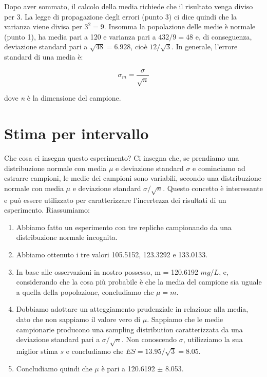 \documentclass[a4paper,12pt,oneside]{book}
\providecommand{\tightlist}{%
  \setlength{\itemsep}{0pt}\setlength{\parskip}{0pt}}
\begin{document}
Dopo aver sommato, il calcolo della media richiede che il risultato venga diviso per 3. La legge di propagazione degli errori (punto 3) ci dice quindi che la varianza viene divisa per \(3^2 = 9\). Insomma la popolazione delle medie è normale (punto 1), ha media pari a 120 e varianza pari a \(432/9 = 48\) e, di conseguenza, deviazione standard pari a \(\sqrt{48} = 6.928\), cioè \(12/\sqrt{3}\). In generale, l'errore standard di una media è:

\[\sigma_m  = \frac{\sigma }{\sqrt n }\]

dove \emph{n} è la dimensione del campione.

\hypertarget{stima-per-intervallo}{%
\section{Stima per intervallo}\label{stima-per-intervallo}}

Che cosa ci insegna questo esperimento? Ci insegna che, se prendiamo una distribuzione normale con media \(\mu\) e deviazione standard \(\sigma\) e cominciamo ad estrarre campioni, le medie dei campioni sono variabili, secondo una distribuzione normale con media \(\mu\) e deviazione standard \(\sigma / \sqrt{n}\). Questo concetto è interessante e può essere utilizzato per caratterizzare l'incertezza dei risultati di un esperimento. Riassumiamo:

\begin{enumerate}
\def\labelenumi{\arabic{enumi}.}
\tightlist
\item
  Abbiamo fatto un esperimento con tre repliche campionando da una distribuzione normale incognita.
\item
  Abbiamo ottenuto i tre valori 105.5152, 123.3292 e 133.0133.
\item
  In base alle osservazioni in nostro possesso, m = 120.6192 \(mg/L\), e, considerando che la cosa più probabile è che la media del campione sia uguale a quella della popolazione, concludiamo che \(\mu = m\).
\item
  Dobbiamo adottare un atteggiamento prudenziale in relazione alla media, dato che non sappiamo il valore vero di \(\mu\). Sappiamo che le medie campionarie producono una sampling distribution caratterizzata da una deviazione standard pari a \(\sigma / \sqrt{n}\). Non conoscendo \(\sigma\), utilizziamo la sua miglior stima \(s\) e concludiamo che \(ES = 13.95/\sqrt{3} = 8.05\).
\item
  Concludiamo quindi che \(\mu\) è pari a 120.6192 \(\pm\) 8.053.
\end{enumerate}
\end{document}
